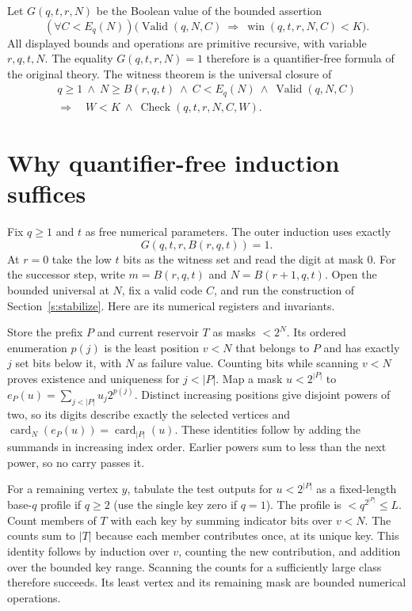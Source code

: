 \documentclass[11pt,letterpaper]{article}
\newcommand{\head}[1]{\section{#1}}
\newcommand{\point}[1]{\par\smallskip{\bfseries\color{ink}#1.}\enspace}
\newcommand{\card}{\operatorname{card}}
\newcommand{\valid}{\operatorname{Valid}}
\newcommand{\checkw}{\operatorname{Check}}
\newcommand{\win}{\operatorname{win}}
\begin{document}
\point{The induction bit} Let $G(q,t,r,N)$ be the Boolean value of the bounded assertion
\[
  (\forall C<E_q(N))\bigl(\valid(q,N,C)\ \Rightarrow\ \win(q,t,r,N,C)<K\bigr).
\]
All displayed bounds and operations are primitive recursive, with variable $r,q,t,N$. The equality $G(q,t,r,N)=1$ therefore is a quantifier-free formula of the original theory. The witness theorem is the universal closure of
\[
 \begin{aligned}
 q\ge1\ \land\ N\ge B(r,q,t)\ \land\ C<E_q(N)\ \land\ \valid(q,N,C)
  \\ {}\Longrightarrow\quad W<K\ \land\ \checkw(q,t,r,N,C,W).
 \end{aligned}
\]
\clearpage

\head{Why quantifier-free induction suffices}\label{s:internal}
Fix $q\ge1$ and $t$ as free numerical parameters. The outer induction uses exactly
\begin{equation}
                    G(q,t,r,B(r,q,t))=1 .                     \tag{4}\label{eq:ind}
\end{equation}
At $r=0$ take the low $t$ bits as the witness set and read the digit at mask $0$. For the successor step, write $m=B(r,q,t)$ and $N=B(r+1,q,t)$. Open the bounded universal at $N$, fix a valid code $C$, and run the construction of Section~\ref{s:stabilize}. Here are its numerical registers and invariants.

\point{Selection and counting} Store the prefix $P$ and current reservoir $T$ as masks $<2^N$. Its ordered enumeration $p(j)$ is the least position $v<N$ that belongs to $P$ and has exactly $j$ set bits below it, with $N$ as failure value. Counting bits while scanning $v<N$ proves existence and uniqueness for $j<|P|$. Map a mask $u<2^{|P|}$ to $e_P(u)=\sum_{j<|P|} u_j2^{p(j)}$. Distinct increasing positions give disjoint powers of two, so its digits describe exactly the selected vertices and $\card_N(e_P(u))=\card_{|P|}(u)$. These identities follow by adding the summands in increasing index order. Earlier powers sum to less than the next power, so no carry passes it.

For a remaining vertex $y$, tabulate the test outputs for $u<2^{|P|}$ as a fixed-length base-$q$ profile if $q\ge2$ (use the single key zero if $q=1$). The profile is $<q^{2^{|P|}}\le L$. Count members of $T$ with each key by summing indicator bits over $v<N$. The counts sum to $|T|$ because each member contributes once, at its unique key. This identity follows by induction over $v$, counting the new contribution, and addition over the bounded key range. Scanning the counts for a sufficiently large class therefore succeeds. Its least vertex and its remaining mask are bounded numerical operations.
\end{document}
